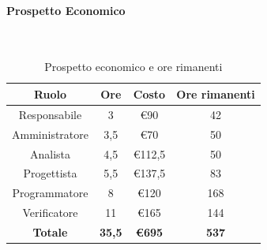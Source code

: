 \documentclass{article}
\begin{document}
                \paragraph{Prospetto Economico}\mbox{}\\
                \begin{table}[H]
                    \centering
                    \begin{tabular}{|c|c|c|c|}
                    \hline
                    \textbf{Ruolo}  & \textbf{Ore}  & \textbf{Costo} & \textbf{Ore rimanenti} \\ \hline
                    Responsabile    & 3             & €90            & 42                     \\ \hline
                    Amministratore  & 3,5           & €70            & 50                   \\ \hline
                    Analista        & 4,5           & €112,5          & 50                   \\ \hline
                    Progettista     & 5,5           & €137,5         & 83                   \\ \hline
                    Programmatore   & 8            & €120           & 168                    \\ \hline
                    Verificatore    & 11            & €165           & 144                    \\ \hline
                    \textbf{Totale} & \textbf{35,5} & \textbf{\euro695}   & \textbf{537}         \\ \hline
                    \end{tabular}
                    \caption{Prospetto economico e ore rimanenti}
                \end{table}
\end{document}
